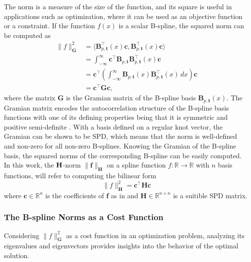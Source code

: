 The norm is a measure of the size of the function, and its square is useful in applications such as optimization, where it can be used as an objective function or a constraint. If the function $f(x)$ is a scalar B-spline, the squared norm can be computed as
\begin{equation}
    \label{eq:norm-spline}
    \begin{aligned}
        \|f\|_\mathbf G^2 &= \langle\mathbf B_{p, \mathbf t}^\top(x) \mathbf c, \mathbf B_{p, \mathbf t}^\top(x) \mathbf c\rangle \\
        &= \int_{-\infty}^\infty \mathbf c^\top \mathbf B_{p, \mathbf t}\mathbf B_{p, \mathbf t}^\top(x) \mathbf c \\
        &= \mathbf c^\top \left(\int_{-\infty}^\infty \mathbf B_{p, \mathbf t}(x) \mathbf B_{p, \mathbf t}^\top(x) \, dx\right) \mathbf c \\
        &= \mathbf c^\top \mathbf G \mathbf c,
\end{aligned}
\end{equation}
where the matrix $\mathbf G$ is the Gramian matrix of the B-spline basis $\mathbf B_{p, \mathbf t}(x)$. The Gramian matrix encodes the autocorrelation  structure of the B-spline basis functions with one of its defining properties being that it is symmetric and positive semi-definite \citep{horn2013positive}. With a basis defined on a regular knot vector, the Gramian can be shown to be \acrfull{SPD}, which means that the norm is well-defined and non-zero for all non-zero B-splines.  Knowing the Gramian of the B-spline basis, the squared norms of the corresponding B-spline can be easily computed. In this work, the $\bf H$-norm $\|\mathbf f\|_\mathbf H$ on a spline function $f: \mathbb R\to\mathbb R$ with $n$ basis functions, will refer to computing the bilinear form
\begin{equation}\label{eq:b-spline-norm}
    \|f\|_\mathbf H^2 = \mathbf{c}^\top \mathbf H \mathbf {c}
\end{equation}
where $\mathbf{c}\in\mathbb R^{n}$ is the coefficients of $\mathbf f$ as in and $\mathbf H\in\mathbb R^{n\times n}$ is a suitible SPD matrix. 



\subsubsection{The B-spline Norms as a Cost Function}\label{sec:b-spline-norms-as-cost-functions}
Considering $\|f\|_\mathbf G^2$ as a cost function in an optimization problem, analyzing its eigenvalues and eigenvectors provides insights into the behavior of the optimal solution.


